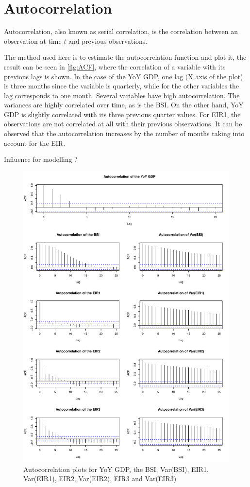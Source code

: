 \documentclass[12pt,a4paper,oneside]{book}
\begin{document}
\section{Autocorrelation}

Autocorrelation, also known as serial correlation, is the correlation between an observation at time $t$ and previous observations.

The method used here is to estimate the autocorrelation function and plot it, the result can be seen in \autoref{fig:ACF}, where the correlation of a variable with its previous lags is shown. 
In the case of the YoY GDP, one lag (X axis of the plot) is three months since the variable is quarterly, while for the other variables the lag corresponds to one month.
Several variables have high autocorrelation. The variances are highly correlated over time, as is the BSI. 
On the other hand, YoY GDP is slightly correlated with its three previous quarter values. 
For EIR1, the observations are not correlated at all with their previous observations. It can be observed that the autocorrelation increases by the number of months taking into account for the EIR.

Influence for modelling ?


\begin{figure}[!htbp]
    \centering
    \includegraphics[scale=0.75]{Graphs/ACF.pdf}
    \caption{Autocorrelation plots for YoY GDP, the BSI, Var(BSI), EIR1, Var(EIR1), EIR2, Var(EIR2), EIR3 and Var(EIR3)}
    \label{fig:ACF}
\end{figure}
\end{document}
